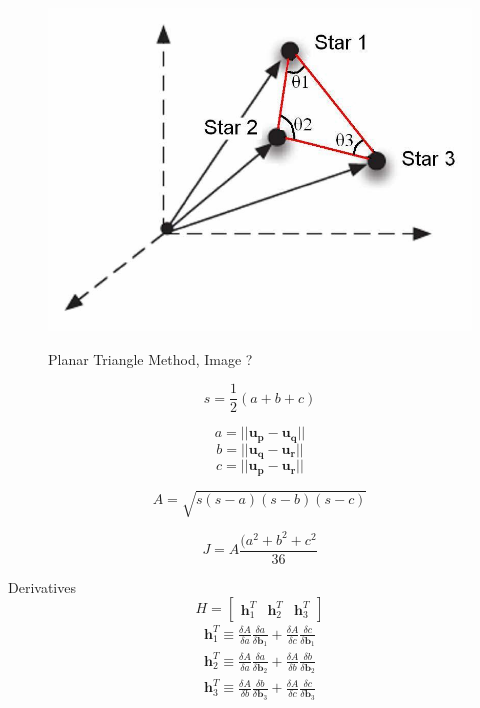 \documentclass[12pt,a4paper,oneside]{article}
\begin{document}
\begin{figure}[h]
\includegraphics[scale=0.30]{planar_triangle_method.jpg}
\centering
\label{fig:body_frame}
\caption{Planar Triangle Method, Image \cite{cole2006fast}?}
\end{figure}

\cite{cole2006fast}\par

\begin{equation}
s = \frac{1}{2}(a + b + c)
\end{equation}

\begin{equation}
a = ||\bm{u_p} - \bm{u_q}||
\end{equation}
\begin{equation}
b = ||\bm{u_q} - \bm{u_r}||
\end{equation}
\begin{equation}
c = ||\bm{u_p} - \bm{u_r}||
\end{equation}

\begin{equation}
A = \sqrt{s(s-a)(s-b)(s-c)}
\end{equation}

\begin{equation}
J = A\frac{(a^2 + b^2 + c^2}{36}
\end{equation}

Derivatives
\begin{equation}
H = \begin{bmatrix}
\bm{h}_1^T & \bm{h}_2^T & \bm{h}_3^T
\end{bmatrix}
\end{equation}
\begin{subequations}
\begin{align*}
\bm{h}_1^T \equiv \frac{\delta A}{\delta a}\frac{\delta a}{\delta\bm{b}_1} + \frac{\delta A}{\delta c}\frac{\delta c}{\delta\bm{b}_1} \\
\bm{h}_2^T \equiv \frac{\delta A}{\delta a}\frac{\delta a}{\delta\bm{b}_2} + \frac{\delta A}{\delta b}\frac{\delta b}{\delta\bm{b}_2}  \\
\bm{h}_3^T \equiv \frac{\delta A}{\delta b}\frac{\delta b}{\delta\bm{b}_3} + \frac{\delta A}{\delta c}\frac{\delta c}{\delta\bm{b}_3} 
\end{align*}
\end{subequations}
\end{document}
